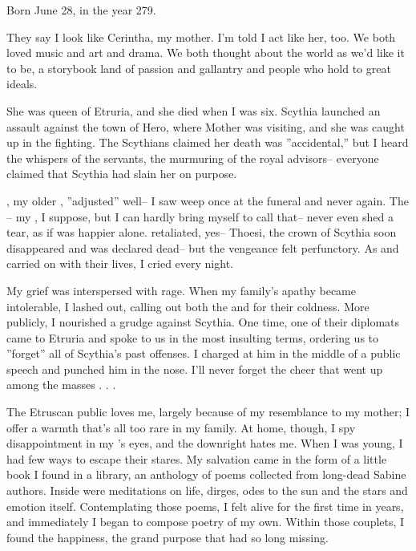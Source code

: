 \documentclass[char]{Kos}
\begin{document}
\name{\cPoet{}}

Born June 28, in the year 279.

They say I look like Cerintha, my mother. I'm told I act like her, too. We both loved music and art and drama. We both thought about the world as we'd like it to be, a storybook land of passion and gallantry and people who hold to great ideals. 

She was queen of Etruria, and she died when I was six. Scythia launched an assault against the town of Hero, where Mother was visiting, and she was caught up in the fighting. The Scythians claimed her death was ''accidental,'' but I heard the whispers of the servants, the murmuring of the royal advisors-- everyone claimed that Scythia had slain her on purpose. 

\cGroom{}, my older \cGroom{\sibling}, ''adjusted'' well-- I saw \cGroom{\them} weep once at the funeral and never again. The \cEtruriaKing{\monarch}-- my \cEtruriaKing{\parent}, I suppose, but I can hardly bring myself to call \cEtruriaKing{\them} that-- never even shed a tear, as if \cEtruriaKing{\they} was happier alone. \cEtruriaKing{\They} retaliated, yes-- Thoesi, the crown \cFugitive{\prince} of Scythia soon disappeared and was declared dead-- but the vengeance felt perfunctory. As \cEtruriaKing{\they} and \cGroom{} carried on with their lives, I cried every night.

My grief was interspersed with rage. When my family's apathy became intolerable, I lashed out, calling out both the \cEtruriaKing{\monarch} and \cGroom{} for their coldness. More publicly, I nourished a grudge against Scythia. One time, one of their diplomats came to Etruria and spoke to us in the most insulting terms, ordering us to ''forget'' all of Scythia's past offenses. I charged at him in the middle of a public speech and punched him in the nose. I'll never forget the cheer that went up among the masses . . .

The Etruscan public loves me, largely because of my resemblance to my mother; I offer a warmth that's all too rare in my family. At home, though, I spy disappointment in my \cGroom{\sibling}'s eyes, and the \cEtruriaKing{\monarch} downright hates me. When I was young, I had few ways to escape their stares. My salvation came in the form of a little book I found in a library, an anthology of poems collected from long-dead Sabine authors. Inside were meditations on life, dirges, odes to the sun and the stars and emotion itself. Contemplating those poems, I felt alive for the first time in years, and immediately I began to compose poetry of my own. Within those couplets, I found the happiness, the grand purpose that had so long missing.
\end{document}
